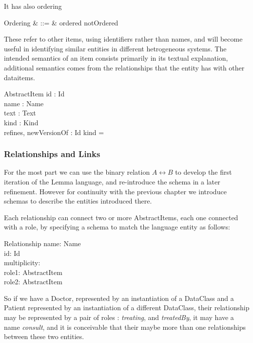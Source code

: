 \documentclass[a4paper,twoside]{article}
\def\abstractitem{\mathsf{abstractitem}}
\begin{document}
It has also ordering 
\begin{syntax}
	Ordering & ::= & ordered \mid notOrdered 
\end{syntax}


These refer to other items, using identifiers rather than names, and will become useful in identifying similar entities in different hetrogeneous systems. The intended semantics of an item consists primarily in its textual explanation, additional semantics comes from the relationships that the entity has with other dataitems.

\begin{schema}{AbstractItem}
	id : Id \\
	name : Name \\
	text : Text \\
	kind : Kind \\
	refines, newVersionOf : \power Id
	\where
	kind = \abstractitem
\end{schema}

\subsubsection{Relationships and Links}

For the most part we can use the binary relation  $ A \rel B $ to develop the first iteration of the Lemma language, and re-introduce the schema in a later refinement. However for continuity with the previous chapter we introduce schemas to describe the entities introduced there. 

Each relationship can connect two or more AbstractItems, each one connected with a role,  by specifying a schema to match the language entity as follows:

\begin{schema}{Relationship}
	name: Name \\
	id: Id \\
	multiplicity: \power \nat \\
	role1: AbstractItem \\
	role2: AbstractItem
\end{schema}

So if we have a Doctor, represented by an instantiation of a DataClass and a Patient represented by an instantiation of a different DataClass, their relationship may be represented by a pair of roles : \emph{treating}, and \emph{treatedBy}, it may have a name \emph{consult}, and it is conceivable that their maybe more than one relationships between these two entities. 
\end{document}
